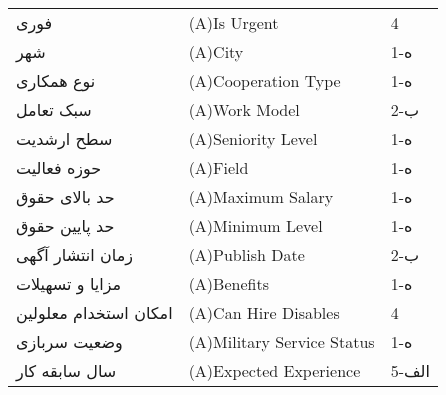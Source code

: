 \documentclass[12pt]{article}
\begin{document}
\begin{table}[]
\begin{tabular}{lll}
			فوری                                 & (A)Is Urgent                                                                                                  & 4     \\
			شهر                                  & (A)City                                                                                                       & 1-ه   \\
			نوع همکاری                           & (A)Cooperation Type                                                                                           & 1-ه   \\
			سبک تعامل                            & (A)Work Model                                                                                                 & 2-ب   \\
			سطح ارشدیت                           & (A)Seniority Level                                                                                            & 1-ه   \\
			حوزه فعالیت                          & (A)Field                                                                                                      & 1-ه   \\
			حد بالای حقوق                        & (A)Maximum Salary                                                                                             & 1-ه   \\
			حد پایین حقوق                        & (A)Minimum Level                                                                                              & 1-ه   \\
			زمان انتشار آگهی                     & (A)Publish Date                                                                                               & 2-ب   \\
			مزایا و تسهیلات                      & (A)Benefits                                                                                                   & 1-ه   \\
			امکان استخدام معلولین                & (A)Can Hire Disables                                                                                          & 4     \\
			وضعیت سربازی                         & (A)Military Service Status                                                                                    & 1-ه   \\
			سال سابقه کار                        & (A)Expected Experience                                                                                        & 5-الف \\

\end{tabular}
\end{table}
\end{document}
